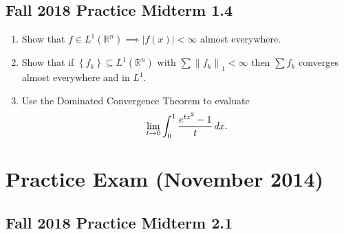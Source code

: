 \hypertarget{fall-2018-practice-midterm-1.4}{%
\subsection{Fall 2018 Practice Midterm
1.4}\label{fall-2018-practice-midterm-1.4}}

\begin{enumerate}
\def\labelenumi{\alph{enumi}.}
\item
  Show that
  \(f\in L^1({\mathbb{R}}^n) \implies {\left\lvert {f(x)} \right\rvert} < \infty\)
  almost everywhere.
\item
  Show that if \(\left\{{f_k}\right\} \subseteq L^1({\mathbb{R}}^n)\)
  with \(\sum {\left\lVert {f_k} \right\rVert}_1 < \infty\) then
  \(\sum f_k\) converges almost everywhere and in \(L^1\).
\item
  Use the Dominated Convergence Theorem to evaluate
  \begin{align*}
  \lim_{t\to 0} \int_0^1 {e^{tx^2} - 1 \over t} \,dx
  .\end{align*}
\end{enumerate}

\hypertarget{practice-exam-november-2014-1}{%
\section{Practice Exam (November
2014)}\label{practice-exam-november-2014-1}}

\hypertarget{fall-2018-practice-midterm-2.1}{%
\subsection{Fall 2018 Practice Midterm
2.1}\label{fall-2018-practice-midterm-2.1}}

